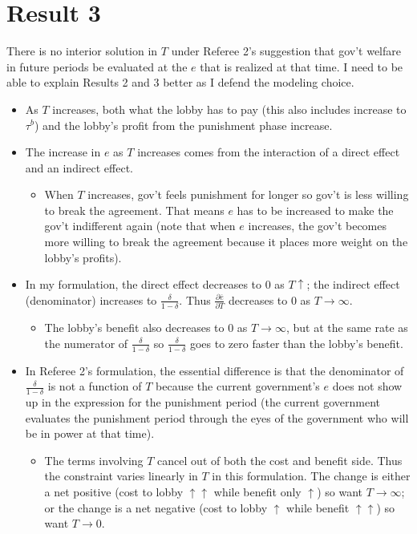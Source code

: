 \documentclass[12pt]{article}
\newcommand{\ov}{\overline}
\newcommand{\de}{\delta}
\begin{document}
\section*{Result 3}
There is no interior solution in $T$ under Referee 2's suggestion that gov't welfare in future periods be evaluated at the $e$ that is realized at that time. I need to be able to explain Results 2 and 3 better as I defend the modeling choice.
\begin{itemize}
	\item As $T$ increases, both what the lobby has to pay (this also includes increase to $\tau^b$) and the lobby's profit from the punishment phase increase.
	\item The increase in $e$ as $T$ increases comes from the interaction of a direct effect and an indirect effect.
		\begin{itemize}
			\item When $T$ increases, gov't feels punishment for longer so gov't is less willing to break the agreement. That means $e$ has to be increased to make the gov't indifferent again (note that when $e$ increases, the gov't becomes more willing to break the agreement because it places more weight on the lobby's profits).
		\end{itemize}
	\item In my formulation, the direct effect decreases to $0$ as $T \uparrow$; the indirect effect (denominator) increases to $\frac{\de}{1-\de}$. Thus $\frac{\partial \ov{e}}{\partial T}$ decreases to $0$ as $T \rightarrow \infty$.
		\begin{itemize}
			\item The lobby's benefit also decreases to $0$ as $T \rightarrow \infty$, but at the same rate as the numerator of $\frac{\de}{1-\de}$ so $\frac{\de}{1-\de}$ goes to zero faster than the lobby's benefit.
		\end{itemize}
	\item In Referee 2's formulation, the essential difference is that the denominator of $\frac{\de}{1-\de}$ is not a function of $T$ because the current government's $e$ does not show up in the expression for the punishment period (the current government evaluates the punishment period through the eyes of the government who will be in power at that time).
		\begin{itemize}
			\item The terms involving $T$ cancel out of both the cost and benefit side. Thus the constraint varies linearly in $T$ in this formulation. The change is either a net positive (cost to lobby $\uparrow \uparrow$ while benefit only $\uparrow$) so want $T\rightarrow \infty$; or the change is a net negative (cost to lobby $\uparrow$ while benefit $\uparrow \uparrow$) so want $T\rightarrow 0$.
		\end{itemize}
\end{itemize}
\end{document}
